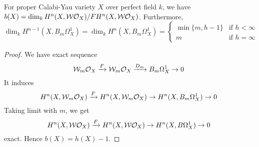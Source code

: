 \documentclass[11pt,a4paper]{scmsnotes}
\begin{document}
\begin{seccor}
For proper Calabi-Yau variety $X$ over perfect field $k$, we have $b(X)= \dim_k H^n(X,\mathcal{W} \mathcal{O}_{X})/F H^n(X,\mathcal{W}\mathcal{O}_{X})$. Furthermore,
\[
\dim_k H^{n-1}(X,B_m \Omega_X^1)=\dim_k H^n(X,B_m \Omega_X^1) = \begin{cases}
\min \{m,h-1\}& \text{if } h < \infty\\
m& \text{if } h = \infty
\end{cases}
\]	
\end{seccor}

\begin{proof}
	We have exact sequence
	\[
	\mathcal{W}_m \mathcal{O}_{X} \xrightarrow{F} \mathcal{W}_m \mathcal{O}_{X} \xrightarrow{D_m} B_m \Omega_X^1 \to 0
	\]
	It induces 
	\[
	H^n(X,\mathcal{W}_m \mathcal{O}_{X}) \xrightarrow{F} H^n(X,\mathcal{W}_m \mathcal{O}_{X}) \to H^n(X,B_m \Omega_X^1) \to 0
	\]
	Taking limit with $m$, we get 
	\[
	H^n(X, \mathcal{W} \mathcal{O}_{X}) \xrightarrow{F} H^n(X,\mathcal{W} \mathcal{O}_{X}) \to H^n(X, B \Omega_X^1) \to 0
	\]
	exact. Hence $b(X)= h(X)-1$. 
\end{proof}


\end{document}
